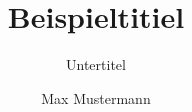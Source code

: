 \documentclass[a4paper,11pt]{tubsreprt}
\title{Beispieltitiel}
\subtitle{Untertitel}
\author{Max Mustermann}
\begin{document}
\begin{gausspage}
  \showtubslogo
  \showtopline
  \begin{segment}{8}
    ~
  \end{segment}
\end{gausspage}
\end{document}
